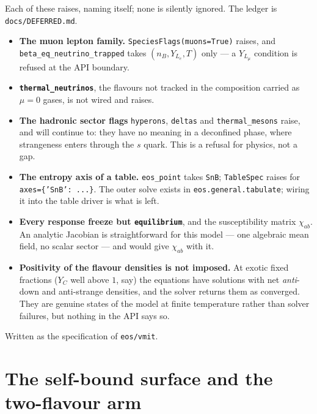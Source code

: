 \documentclass[aps,prc,onecolumn,superscriptaddress,nofootinbib,10pt]{revtex4-2}
\newcommand{\nB}{n_B}
\begin{document}
Each of these raises, naming itself; none is silently ignored. The ledger is
\texttt{docs/DEFERRED.md}.

\begin{itemize}
\item \textbf{The muon lepton family.} \texttt{SpeciesFlags(muons=True)}
      raises, and \texttt{beta\_eq\_neutrino\_trapped} takes
      $(\nB, Y_{L_e}, T)$ only --- a $Y_{L_\mu}$ condition is refused at the
      API boundary.
\item \textbf{\texttt{thermal\_neutrinos}}, the flavours not tracked in the
      composition carried as $\mu = 0$ gases, is not wired and raises.
\item \textbf{The hadronic sector flags} \texttt{hyperons}, \texttt{deltas}
      and \texttt{thermal\_mesons} raise, and will continue to: they have no
      meaning in a deconfined phase, where strangeness enters through the $s$
      quark. This is a refusal for physics, not a gap.
\item \textbf{The entropy axis of a table.} \texttt{eos\_point} takes
      \texttt{SnB}; \texttt{TableSpec} raises for
      \texttt{axes=\{'SnB': ...\}}. The outer solve exists in
      \texttt{eos.general.tabulate}; wiring it into the table driver is what
      is left.
\item \textbf{Every response freeze but \texttt{equilibrium}}, and the
      susceptibility matrix $\chi_{ab}$. An analytic Jacobian is
      straightforward for this model --- one algebraic mean field, no scalar
      sector --- and would give $\chi_{ab}$ with it.
\item \textbf{Positivity of the flavour densities is not imposed.} At exotic
      fixed fractions ($Y_C$ well above $1$, say) the equations have solutions
      with net \emph{anti}-down and anti-strange densities, and the solver
      returns them as converged. They are genuine states of the model at
      finite temperature rather than solver failures, but nothing in the API
      says so.
\end{itemize}

\begin{acknowledgments}
Written as the specification of \texttt{eos/vmit}.
\end{acknowledgments}

\section{The self-bound surface and the two-flavour arm}
\label{sec:zeropressure}
\end{document}
